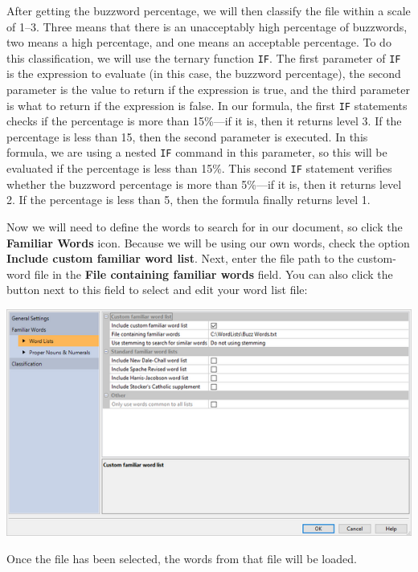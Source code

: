 \documentclass[
]{book}
\theoremstyle{definition}
\theoremstyle{definition}
\theoremstyle{definition}
\theoremstyle{definition}
\theoremstyle{remark}
\begin{document}
After getting the buzzword percentage, we will then classify the file within a scale of 1--3. Three means that there is an unacceptably high percentage of buzzwords, two means a high percentage, and one means an acceptable percentage. To do this classification, we will use the ternary function \texttt{IF}. The first parameter of \texttt{IF} is the expression to evaluate (in this case, the buzzword percentage), the second parameter is the value to return if the expression is true, and the third parameter is what to return if the expression is false. In our formula, the first \texttt{IF} statements checks if the percentage is more than 15\%---if it is, then it returns level 3. If the percentage is less than 15, then the second parameter is executed. In this formula, we are using a nested \texttt{IF} command in this parameter, so this will be evaluated if the percentage is less than 15\%. This second \texttt{IF} statement verifies whether the buzzword percentage is more than 5\%---if it is, then it returns level 2. If the percentage is less than 5, then the formula finally returns level 1.

Now we will need to define the words to search for in our document, so click the \textbf{Familiar Words} icon. Because we will be using our own words, check the option \textbf{Include custom familiar word list}. Next, enter the file path to the custom-word file in the \textbf{File containing familiar words} field. You can also click the button next to this field to select and edit your word list file:

\includegraphics{Images/CustomIndexTestExampleWordsLoaded.png}

Once the file has been selected, the words from that file will be loaded.
\end{document}
